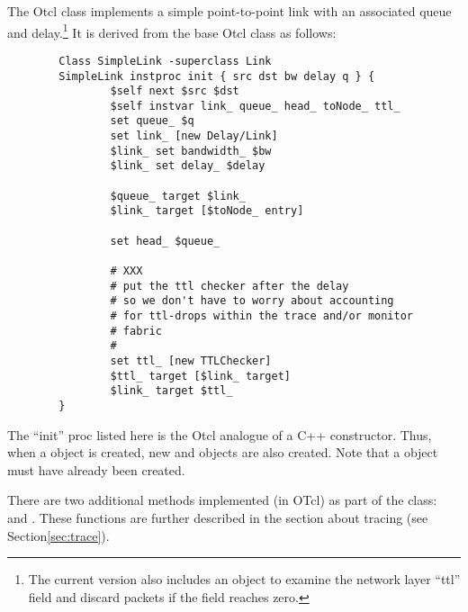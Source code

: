 The Otcl class  implements a simple point-to-point
link with an associated queue and
delay.\footnote{The current
version also includes an object to examine the
network layer ``ttl'' field and discard packets if the
field reaches zero.}
It is derived from the base Otcl class  as follows:
\begin{small}
\begin{verbatim}
        Class SimpleLink -superclass Link
        SimpleLink instproc init { src dst bw delay q } {
                $self next $src $dst
                $self instvar link_ queue_ head_ toNode_ ttl_
                set queue_ $q
                set link_ [new Delay/Link]
                $link_ set bandwidth_ $bw
                $link_ set delay_ $delay

                $queue_ target $link_
                $link_ target [$toNode_ entry]

                set head_ $queue_

                # XXX
                # put the ttl checker after the delay
                # so we don't have to worry about accounting
                # for ttl-drops within the trace and/or monitor
                # fabric
                #
                set ttl_ [new TTLChecker]
                $ttl_ target [$link_ target]
                $link_ target $ttl_
        }
\end{verbatim}
\end{small}
The ``init'' proc listed here is the Otcl analogue of a C++
constructor.
Thus, when a  object is created,
new  and  objects are
also created.
Note that a  object must have already been created.

There are two additional methods implemented (in OTcl) as part
of the  class:  and .
These functions are further described in the section about tracing
(see Section\ref{sec:trace}).

